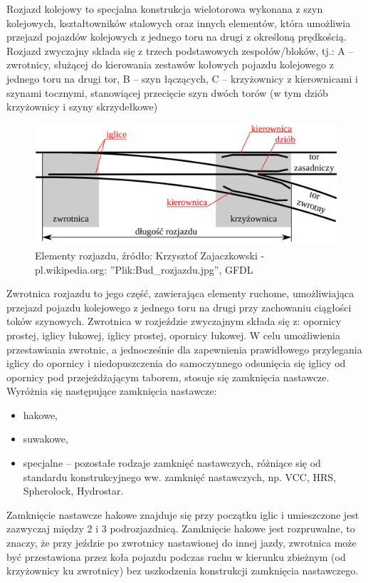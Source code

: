Rozjazd kolejowy to specjalna konstrukcja wielotorowa wykonana z szyn kolejowych,
kształtowników stalowych oraz innych elementów, która umożliwia przejazd pojazdów kolejowych
z jednego toru na drugi z określoną prędkością.
Rozjazd zwyczajny składa się z trzech podstawowych zespołów/bloków, tj.:
A – zwrotnicy, służącej do kierowania zestawów kołowych pojazdu kolejowego
z jednego toru na drugi tor,
B – szyn łączących,
C – krzyżownicy z kierownicami i szynami tocznymi, stanowiącej przecięcie szyn dwóch torów (w tym dziób krzyżownicy i szyny skrzydełkowe)

\begin{figure}
	\includegraphics[width=12cm]{skryptkierownik-img/rozjazd.png}
	\caption{Elementy rozjazdu, źródło: Krzysztof Zajaczkowski - pl.wikipedia.org: ''Plik:Bud\_rozjazdu.jpg'', GFDL}
	\label{fig:rozjazd}
\end{figure}
Zwrotnica rozjazdu to jego część, zawierająca elementy ruchome, umożliwiająca przejazd pojazdu
kolejowego z jednego toru na drugi przy zachowaniu ciągłości toków szynowych.
Zwrotnica w rozjeździe zwyczajnym składa się z: opornicy prostej, iglicy łukowej, iglicy prostej, opornicy łukowej.
W celu umożliwienia przestawiania zwrotnic, a jednocześnie dla zapewnienia prawidłowego
przylegania iglicy do opornicy i niedopuszczenia do samoczynnego odsunięcia się iglicy od opornicy
pod przejeżdżającym taborem, stosuje się zamknięcia nastawcze.
Wyróżnia się następujące zamknięcia nastawcze:
\begin{itemize}
	\item hakowe,
	\item suwakowe,
	\item specjalne – pozostałe rodzaje zamknięć nastawczych, różniące się od standardu
	konstrukcyjnego ww. zamknięć nastawczych, np. VCC, HRS, Spherolock, Hydrostar.
\end{itemize}

Zamknięcie nastawcze hakowe znajduje się przy początku iglic i umieszczone jest zazwyczaj między 2 i 3 podrozjazdnicą.
Zamknięcie hakowe jest rozpruwalne, to znaczy, że przy jeździe po zwrotnicy nastawionej do innej jazdy, zwrotnica może być przestawiona przez koła pojazdu podczas ruchu w kierunku zbieżnym (od krzyżownicy ku zwrotnicy) bez uszkodzenia konstrukcji zamknięcia nastawczego.

